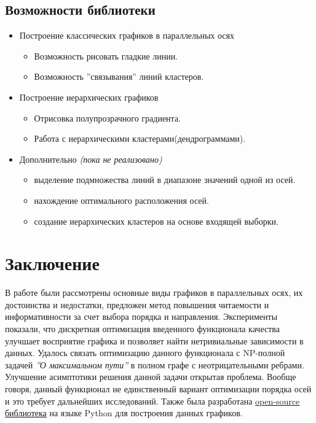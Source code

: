 \documentclass[12pt,fleqn]{article}
\begin{document}
\subsection{Возможности библиотеки}
\begin{itemize}
    \item Построение классических графиков в параллельных осях
    \begin{itemize}

        \item Возможность рисовать гладкие линии.
        \item Возможность ''связывания'' линий кластеров.
    \end{itemize}
    \item Построение иерархических графиков
    \begin{itemize}
        \item Отрисовка полупрозрачного градиента.
        \item Работа с иерархическими кластерами(дендрограммами).
    \end{itemize}
    \item Дополнительно \textit{(пока не реализовано)}
    \begin{itemize}
        \item выделение подмножества линий в  диапазоне значений одной из осей.
        \item нахождение оптимального расположения осей.
        \item создание иерархических кластеров на основе входящей выборки.
    \end{itemize}
\end{itemize}

\section{Заключение}
В работе были рассмотрены основные виды графиков в параллельных осях, их достоинства и недостатки, 
предложен метод повышения читаемости и информативности за счет выбора порядка и направления. Эксперименты
показали, что дискретная оптимизация введенного функционала качества улучшает восприятие графика и позволяет найти 
нетривиальные зависимости в данных. Удалось связать оптимизацию данного функционала с NP-полной задачей 
\textit{''О максимальном пути''} в полном графе с неотрицательными ребрами. Улучшение асимптотики
решения данной задачи открытая проблема. Вообще говоря, данный функционал не единственный вариант оптимизации порядка осей и это требует
дальнейших исследований. Также была разработана \href{https://github.com/Tytskiy/hpcoords}{open-source библиотека} на языке Python для построения данных графиков.
\end{document}
